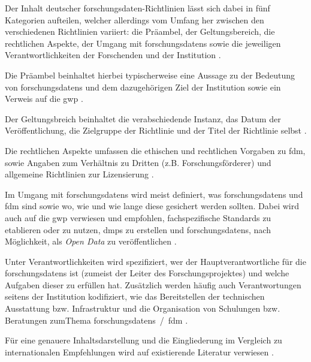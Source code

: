 Der Inhalt deutscher \gls{forschungsdaten}-Richtlinien lässt sich dabei in fünf Kategorien aufteilen, welcher allerdings vom Umfang her zwischen den verschiedenen Richtlinien variiert:
die Präambel, der Geltungsbereich, die rechtlichen Aspekte, der Umgang mit \glspl{forschungsdaten} sowie die jeweiligen Verantwortlichkeiten der Forschenden und der Institution \autocite{Hiemenz2018-fdm-report}.

Die Präambel beinhaltet hierbei typischerweise eine Aussage zu der Bedeutung von \glspl{forschungsdaten} und dem dazugehörigen Ziel der Institution sowie ein Verweis auf die \gls{gwp} \autocite{Hiemenz2018-fdm-report}.

Der Geltungsbreich beinhaltet die verabschiedende Instanz, das Datum der Veröffentlichung, die Zielgruppe der Richtlinie und der Titel der Richtlinie selbst \autocite{Hiemenz2018-fdm-report}.

Die rechtlichen Aspekte umfassen die ethischen und rechtlichen Vorgaben zu \gls{fdm}, sowie Angaben zum Verhältnis zu Dritten (z.B. Forschungsförderer) und allgemeine Richtlinien zur Lizensierung \autocite{Hiemenz2018-fdm-report}.

Im Umgang mit \glspl{forschungsdaten} wird meist definiert, was \glspl{forschungsdaten} und \gls{fdm} sind sowie wo, wie und wie lange diese gesichert werden sollten.
Dabei wird auch auf die \gls{gwp} verwiesen und empfohlen, fachspezifische Standards zu etablieren oder zu nutzen, \glspl{dmp} zu erstellen und \glspl{forschungsdaten}, nach Möglichkeit, als \textit{Open Data} zu veröffentlichen \autocite{Hiemenz2018-fdm-report}.

Unter Verantwortlichkeiten wird spezifiziert, wer der Hauptverantwortliche für die \glspl{forschungsdaten} ist (zumeist der Leiter des Forschungsprojektes) und welche Aufgaben dieser zu erfüllen hat.
Zusätzlich werden häufig auch Verantwortungen seitens der Institution kodifiziert, wie das Bereitstellen der technischen Ausstattung bzw. Infrastruktur und die Organisation von Schulungen bzw. Beratungen zumThema \glspl{forschungsdaten}~/~\gls{fdm} \autocite{Hiemenz2018-fdm-report}.

Für eine genauere Inhaltsdarstellung und die Eingliederung im Vergleich zu internationalen Empfehlungen wird auf existierende Literatur verwiesen \autocite{Hiemenz2018-fdm-report}.

